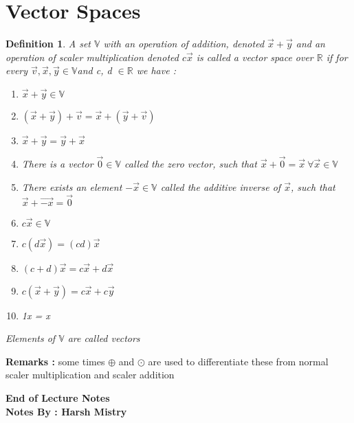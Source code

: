 \documentclass{article}
\newtheorem{definition}[theorem]{Definition}
\begin{document}
 \section{Vector Spaces}
 \begin{definition}
A set \(\mathbb{V}\) with an operation of addition, denoted \(\vec{x} + \vec{y}\) and an operation of scaler multiplication denoted \( c\vec{x} \) is called a vector space over \( \mathbb{R}\) if for every \(\vec{v}, \vec{x}, \vec{y} \in \mathbb{V} \)and  c, d \( \in \mathbb{R}\) we have : 
\begin{enumerate}
\item \( \vec{x} + \vec{y} \in \mathbb{V} \)
\item \( (\vec{x} + \vec{y}) + \vec{v} = \vec{x} + (\vec{y} + \vec{v}) \)
\item \( \vec{x} + \vec{y} = \vec{y} + \vec{x}\)
\item There is a vector \(\vec{0} \in \mathbb{V} \) called the zero vector, such that \( \vec{x} + \vec{0} = \vec{x} \ \forall \vec{x} \in \mathbb{V}\) 
\item There exists an element \( -\vec{x} \in \mathbb{V}\) called the additive inverse of \( \vec{x} \), such that \(\vec{x} + \vec{-x} = \vec{0}\)
\item \(c\vec{x} \in \mathbb{V}\)
\item \(c(d\vec{x}) = (cd) \vec{x}\) 
\item \( (c+d)\vec{x} = c\vec{x} + d\vec{x}\)
\item \(c(\vec{x} + \vec{y}) = c\vec{x} + c\vec{y}\)
\item 1x = x
\end{enumerate}

Elements of \(\mathbb{V}\) are called vectors 
 \end{definition}

\textbf{Remarks : }  some times \(\oplus\) and \(\odot\) are used to differentiate these from normal scaler multiplication and scaler addition 

\begin{center}
\textbf{End of Lecture Notes} \\
\textbf{Notes By : Harsh Mistry}
\end{center}
\end{document}
